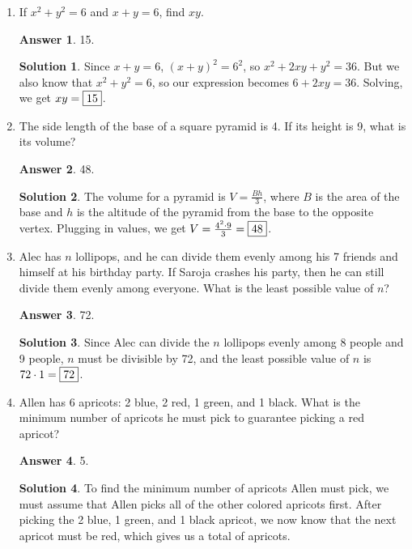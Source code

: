 \documentclass[11pt]{article}
\theoremstyle{definition}
\newtheorem*{solution}{Solution}
\newtheorem*{answer}{Answer}
\begin{document}
\begin{enumerate}
\item %
If $x^2+y^2 = 6$ and $x+y = 6$, find $xy$.

\begin{answer}
15.
\end{answer}
\begin{solution}
 Since $x+y = 6$, $(x+y)^2 = 6^2$, so $x^2+2xy+y^2 = 36$. But we also know that $x^2+y^2 = 6$, so our expression becomes $6+2xy = 36$. Solving, we get $xy = \framebox{15}$.
\end{solution}

\item %
The side length of the base of a square pyramid is 4. If its height is 9, what is its volume?

\begin{answer}
48.
\end{answer}
\begin{solution}
 The volume for a pyramid is $V = \frac{Bh}{3}$, where $B$ is the area of the base and $h$ is the altitude of the pyramid from the base to the opposite vertex. Plugging in values, we get $V = \frac{4^{2} \cdot 9}{3} = \framebox{48}$.
\end{solution}

\item %
Alec has $n$ lollipops, and he can divide them evenly among his 7 friends and himself at his birthday party. If Saroja crashes his party, then he can still divide them evenly among everyone. What is the least possible value of $n$?

\begin{answer}
72.
\end{answer}
\begin{solution}
 Since Alec can divide the $n$ lollipops evenly among 8 people and 9 people, $n$ must be divisible by 72, and the least possible value of $n$ is $72 \cdot 1 = \framebox{72}$.
\end{solution}

\item %
Allen has 6 apricots: 2 blue, 2 red, 1 green, and 1 black. What is the minimum number of apricots he must pick to guarantee picking a red apricot?

\begin{answer}
5.
\end{answer}
\begin{solution}
 To find the minimum number of apricots Allen must pick, we must assume that Allen picks all of the other colored apricots first. After picking the 2 blue, 1 green, and 1 black apricot, we now know that the next apricot must be red, which gives us a total of  apricots.
\end{solution}


\end{enumerate}
\end{document}
